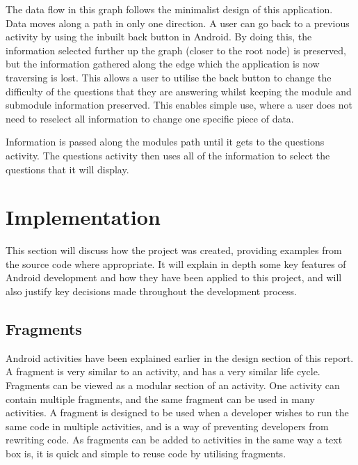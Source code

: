 \documentclass{article}
\begin{document}
The data flow in this graph follows the minimalist design of this application. Data moves along a path in only one direction. A user can go back to a previous activity by using the inbuilt back button in Android. By doing this, the information selected further up the graph (closer to the root node) is preserved, but the information gathered along the edge which the application is now traversing is lost. This allows a user to utilise the back button to change the difficulty of the questions that they are answering whilst keeping the module and submodule information preserved. This enables simple use, where a user does not need to reselect all information to change one specific piece of data. \par

Information is passed along the modules path until it gets to the questions activity. The questions activity then uses all of the information to select the questions that it will display. \par

\section{Implementation}
\label{section:implementation}

This section will discuss how the project was created, providing examples from the source code where appropriate. It will explain in depth some key features of Android development and how they have been applied to this project, and will also justify key decisions made throughout the development process. \par

\subsection{Fragments}

Android activities have been explained earlier in the design section of this report. A fragment is very similar to an activity, and has a very similar life cycle. Fragments can be viewed as a modular section of an activity. One activity can contain multiple fragments, and the same fragment can be used in many activities. A fragment is designed to be used when a developer wishes to run the same code in multiple activities, and is a way of preventing developers from rewriting code. As fragments can be added to activities in the same way a text box is, it is quick and simple to reuse code by utilising fragments. \par
\end{document}
